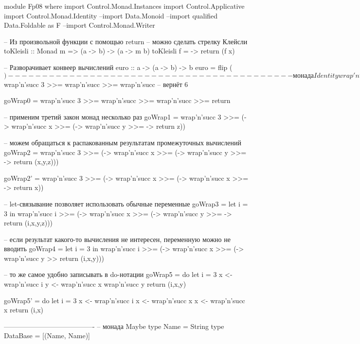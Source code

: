 ﻿module Fp08 where
import Control.Monad.Instances
import Control.Applicative
import Control.Monad.Identity
--import Data.Monoid
--import qualified Data.Foldable as F
--import Control.Monad.Writer

-- Из произвольной функции с помощью return 
-- можно сделать стрелку Клейсли 
toKleisli :: Monad m => (a -> b) -> (a -> m b)
toKleisli f = \x -> return (f x) 

-- Разворачивает конвеер вычислений
euro :: a -> (a -> b) -> b
euro = flip ($)

----------------------------------------
-- монада Identity 
wrap'n'succ :: Integer -> Identity Integer 
wrap'n'succ x = Identity (succ x)

-- runIdentity $ wrap'n'succ 3 >>= wrap'n'succ >>= wrap'n'succ
-- вернёт 6

goWrap0 = wrap'n'succ 3 >>= 
          wrap'n'succ >>= 
          wrap'n'succ >>= 
          return

-- применим третий закон монад несколько раз
goWrap1 = wrap'n'succ 3 >>= (\x -> 
          wrap'n'succ x >>= (\y -> 
          wrap'n'succ y >>=  \z -> 
          return z))

-- можем обращаться к распакованным результатам промежуточных вычислений
goWrap2 = wrap'n'succ 3 >>= (\x -> 
          wrap'n'succ x >>= (\y -> 
          wrap'n'succ y >>=  \z -> 
          return (x,y,z)))

goWrap2' = wrap'n'succ 3 >>= (\x -> 
           wrap'n'succ x >>= (\x -> 
           wrap'n'succ x >>=  \x -> 
           return x))


-- let-связывание позволяет использовать обычные переменные
goWrap3 = let i = 3 in
          wrap'n'succ i >>= (\x -> 
          wrap'n'succ x >>= (\y -> 
          wrap'n'succ y >>=  \z -> 
          return (i,x,y,z)))

-- если результат какого-то вычисления не интересен, переменную можно не вводить 
goWrap4 = let i = 3 in
          wrap'n'succ i >>= (\x -> 
          wrap'n'succ x >>= (\y -> 
          wrap'n'succ y >> 
          return (i,x,y)))

-- то же самое удобно записывать в do-нотации
goWrap5 = do 
          let i = 3
          x <- wrap'n'succ i
          y <- wrap'n'succ x
          wrap'n'succ y
          return (i,x,y)

goWrap5' = do 
          let i = 3
          x <- wrap'n'succ i
          x <- wrap'n'succ x
          x <- wrap'n'succ x
          return (i,x)

----------------------------------------
-- монада Maybe
type Name = String
type DataBase = [(Name, Name)]

